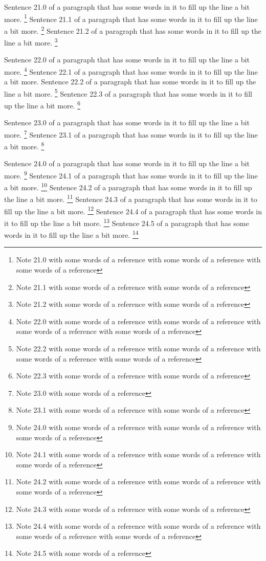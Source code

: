 Sentence 21.0 of a paragraph that has some words in it to fill up the line a bit more. \footnote{Note 21.0 with some words of a reference with some words of a reference with some words of a reference} Sentence 21.1 of a paragraph that has some words in it to fill up the line a bit more. \footnote{Note 21.1 with some words of a reference with some words of a reference} Sentence 21.2 of a paragraph that has some words in it to fill up the line a bit more. \footnote{Note 21.2 with some words of a reference with some words of a reference}

Sentence 22.0 of a paragraph that has some words in it to fill up the line a bit more. \footnote{Note 22.0 with some words of a reference with some words of a reference with some words of a reference with some words of a reference} Sentence 22.1 of a paragraph that has some words in it to fill up the line a bit more. Sentence 22.2 of a paragraph that has some words in it to fill up the line a bit more. \footnote{Note 22.2 with some words of a reference with some words of a reference with some words of a reference with some words of a reference} Sentence 22.3 of a paragraph that has some words in it to fill up the line a bit more. \footnote{Note 22.3 with some words of a reference with some words of a reference}

Sentence 23.0 of a paragraph that has some words in it to fill up the line a bit more. \footnote{Note 23.0 with some words of a reference} Sentence 23.1 of a paragraph that has some words in it to fill up the line a bit more. \footnote{Note 23.1 with some words of a reference with some words of a reference}

Sentence 24.0 of a paragraph that has some words in it to fill up the line a bit more. \footnote{Note 24.0 with some words of a reference with some words of a reference with some words of a reference} Sentence 24.1 of a paragraph that has some words in it to fill up the line a bit more. \footnote{Note 24.1 with some words of a reference with some words of a reference with some words of a reference} Sentence 24.2 of a paragraph that has some words in it to fill up the line a bit more. \footnote{Note 24.2 with some words of a reference with some words of a reference with some words of a reference} Sentence 24.3 of a paragraph that has some words in it to fill up the line a bit more. \footnote{Note 24.3 with some words of a reference with some words of a reference} Sentence 24.4 of a paragraph that has some words in it to fill up the line a bit more. \footnote{Note 24.4 with some words of a reference with some words of a reference with some words of a reference with some words of a reference} Sentence 24.5 of a paragraph that has some words in it to fill up the line a bit more. \footnote{Note 24.5 with some words of a reference}

